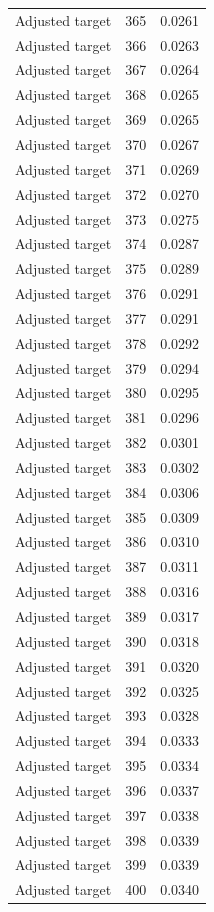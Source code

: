 \begin{table}[htbp]
\begin{tabular}{lll}
Adjusted target & 365 & 0.0261 \\
Adjusted target & 366 & 0.0263 \\
Adjusted target & 367 & 0.0264 \\
Adjusted target & 368 & 0.0265 \\
Adjusted target & 369 & 0.0265 \\
Adjusted target & 370 & 0.0267 \\
Adjusted target & 371 & 0.0269 \\
Adjusted target & 372 & 0.0270 \\
Adjusted target & 373 & 0.0275 \\
Adjusted target & 374 & 0.0287 \\
Adjusted target & 375 & 0.0289 \\
Adjusted target & 376 & 0.0291 \\
Adjusted target & 377 & 0.0291 \\
Adjusted target & 378 & 0.0292 \\
Adjusted target & 379 & 0.0294 \\
Adjusted target & 380 & 0.0295 \\
Adjusted target & 381 & 0.0296 \\
Adjusted target & 382 & 0.0301 \\
Adjusted target & 383 & 0.0302 \\
Adjusted target & 384 & 0.0306 \\
Adjusted target & 385 & 0.0309 \\
Adjusted target & 386 & 0.0310 \\
Adjusted target & 387 & 0.0311 \\
Adjusted target & 388 & 0.0316 \\
Adjusted target & 389 & 0.0317 \\
Adjusted target & 390 & 0.0318 \\
Adjusted target & 391 & 0.0320 \\
Adjusted target & 392 & 0.0325 \\
Adjusted target & 393 & 0.0328 \\
Adjusted target & 394 & 0.0333 \\
Adjusted target & 395 & 0.0334 \\
Adjusted target & 396 & 0.0337 \\
Adjusted target & 397 & 0.0338 \\
Adjusted target & 398 & 0.0339 \\
Adjusted target & 399 & 0.0339 \\
Adjusted target & 400 & 0.0340 \\

\end{tabular}
\end{table}
